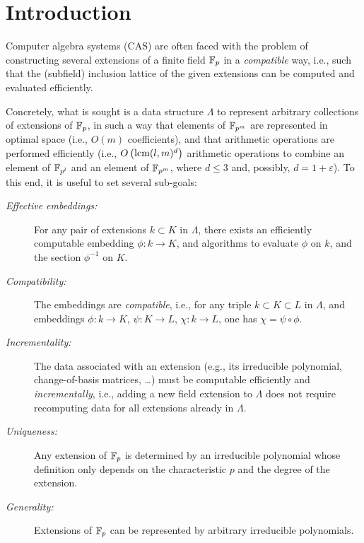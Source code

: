 \documentclass[sigconf]{acmart}
\begin{document}



\maketitle

\section{Introduction}
\label{sec:introduction}

Computer algebra systems (CAS) are often faced with the problem of
constructing several extensions of a finite field $\mathbb{F}_p$ in a
\emph{compatible} way, i.e., such that the (subfield) inclusion
lattice of the given extensions can be computed and evaluated
efficiently.

Concretely, what is sought is a data structure $\Lambda$ to represent
arbitrary collections of extensions of $\mathbb{F}_{p}$, in such a way that
elements of $\mathbb{F}_{p^m}$ are represented in optimal space (i.e., $O(m)$
coefficients), and that arithmetic operations are performed
efficiently (i.e., $O\left(\operatorname{lcm}(l,m)^d\right)$ arithmetic
operations to combine an element of $\mathbb{F}_{p^l}$ and an element of
$\mathbb{F}_{p^m}$, where $d\le 3$ and, possibly, $d=1+\varepsilon$). %
To this end, it is useful to set several sub-goals:

\begin{description}
\item[\emph{Effective embeddings:}] For any pair of extensions
  $k\subset K$ in $\Lambda$, there exists an efficiently computable
  embedding $\phi:k\to K$, and algorithms to evaluate $\phi$ on $k$,
  and the section $\phi^{-1}$ on $K$.
\item[\emph{Compatibility:}] The embeddings are \emph{compatible},
  i.e., for any triple $k\subset K\subset L$ in $\Lambda$, and
  embeddings $\phi:k\to K$, $\psi:K\to L$, $\chi:k\to L$, one has
  $\chi=\psi\circ\phi$.
\item[\emph{Incrementality:}] The data associated with an extension
  (e.g., its irreducible polynomial, change-of-basis matrices, \dots)
  must be computable efficiently and \emph{incrementally}, i.e.,
  adding a new field extension to $\Lambda$ does not require
  recomputing data for all extensions already in $\Lambda$. %
\item[\emph{Uniqueness:}] Any extension of $\mathbb{F}_{p}$ is determined by an
  irreducible polynomial whose definition only depends on the
  characteristic $p$ and the degree of the extension. %
\item[\emph{Generality:}] Extensions of $\mathbb{F}_{p}$ can be represented by
  arbitrary irreducible polynomials.
\end{description}
\end{document}
